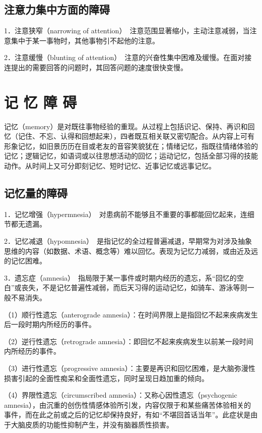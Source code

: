 \subsection{注意力集中方面的障碍}

1．注意狭窄（narrowing of
attention）　注意范围显著缩小，主动注意减弱，当注意集中于某一事物时，其他事物引不起他的注意。

2．注意缓慢（blunting of
attention）　注意的兴奋性集中困难及缓慢。在面对接连提出的需要回答的问题时，其回答问题的速度很快变慢。

\section{记 忆 障 碍}

记忆（memory）是对既往事物经验的重现。从过程上包括识记、保持、再识和回忆（记住、不忘、认得和回想起来），四者既互相关联又密切配合。从内容上可有形象记忆，如旧景历历在目或老友的音容笑貌犹在；情绪记忆，指既往情绪体验的记忆；逻辑记忆，如语词或以往思想活动的回忆；运动记忆，包括全部习得的技能动作。从时间上又可分即刻记忆、短时记忆、近事记忆或远事记忆。

\subsection{记忆量的障碍}

1．记忆增强（hypermnesia）　对患病前不能够且不重要的事都能回忆起来，连细节都无遗漏。

2．记忆减退（hypomnesia）　是指记忆的全过程普遍减退，早期常为对涉及抽象思维的内容（如数据、术语、概念等）难以回忆。表现为记忆力减弱，或由近及远的记忆困难。

3．遗忘症（amnesia）　指局限于某一事件或时期内经历的遗忘，系“回忆的空白”或丧失，不是记忆普遍性减弱，而后天习得的运动记忆，如骑车、游泳等则一般不易消失。

（1）顺行性遗忘（anterograde
amnesia）：在时间界限上是指回忆不起来疾病发生后一段时期内所经历的事件。

（2）逆行性遗忘（retrograde
amnesia）：即回忆不起来疾病发生以前某一段时间内所经历的事件。

（3）进行性遗忘（progressive
amnesia）：主要是再识和回忆困难，是大脑弥漫性损害引起的全面性痴呆和全面性遗忘，同时呈现日趋加重的倾向。

（4）界限性遗忘（circumscribed amnesia）：又称心因性遗忘（psychogenic
amnesia），由沉重的创伤性情感体验所引发，内容仅限于和某些痛苦体验相关的事件，而在此之前或之后的记忆却保持良好，有如“不堪回首话当年”。此症状是由于大脑皮质的功能性抑制产生，并没有脑器质性损害。

